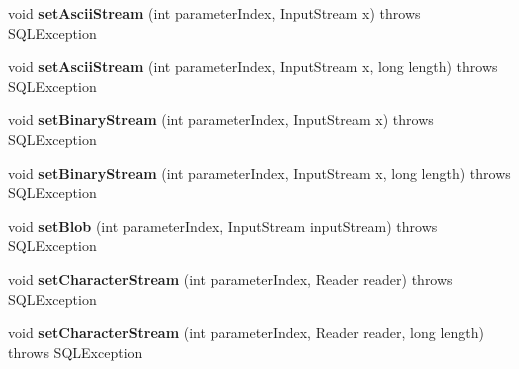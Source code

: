 \begin{DoxyCompactItemize}
\mbox{\label{classcom_1_1mysql_1_1jdbc_1_1_prepared_statement_ab08cc3b0f158f1bf3392142af1b72ba7}} 
void {\bfseries set\+Ascii\+Stream} (int parameter\+Index, Input\+Stream x)  throws S\+Q\+L\+Exception 
\item 
\mbox{\label{classcom_1_1mysql_1_1jdbc_1_1_prepared_statement_a69ea08dddc92989329d784b7ab5f6038}} 
void {\bfseries set\+Ascii\+Stream} (int parameter\+Index, Input\+Stream x, long length)  throws S\+Q\+L\+Exception 
\item 
\mbox{\label{classcom_1_1mysql_1_1jdbc_1_1_prepared_statement_ab24fa29d07ae51c76be9039ddca51b56}} 
void {\bfseries set\+Binary\+Stream} (int parameter\+Index, Input\+Stream x)  throws S\+Q\+L\+Exception 
\item 
\mbox{\label{classcom_1_1mysql_1_1jdbc_1_1_prepared_statement_a5886755ea4d1180dba14c9fe3918a9dc}} 
void {\bfseries set\+Binary\+Stream} (int parameter\+Index, Input\+Stream x, long length)  throws S\+Q\+L\+Exception 
\item 
\mbox{\label{classcom_1_1mysql_1_1jdbc_1_1_prepared_statement_a31fc22e6fd04f28d1530bf13d96f597f}} 
void {\bfseries set\+Blob} (int parameter\+Index, Input\+Stream input\+Stream)  throws S\+Q\+L\+Exception 
\item 
\mbox{\label{classcom_1_1mysql_1_1jdbc_1_1_prepared_statement_adf54e427f59595adc25813f8633dc9cf}} 
void {\bfseries set\+Character\+Stream} (int parameter\+Index, Reader reader)  throws S\+Q\+L\+Exception 
\item 
\mbox{\label{classcom_1_1mysql_1_1jdbc_1_1_prepared_statement_a1db29c704ffbe8b26f483e155a0b3328}} 
void {\bfseries set\+Character\+Stream} (int parameter\+Index, Reader reader, long length)  throws S\+Q\+L\+Exception 
\item 
\mbox{\label{classcom_1_1mysql_1_1jdbc_1_1_prepared_statement_ad0e4fc3bfcdcfd5ae67a29461202be9e}} 

\end{DoxyCompactItemize}
